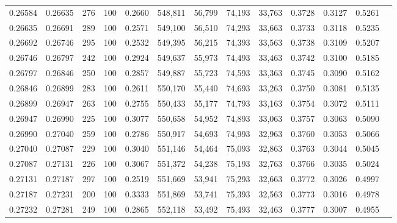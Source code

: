 \begin{tabular}{rrrrrrrrrrrrr}
0.26584 & 0.26635 &   276 & 100 &                                     0.2660 & 548,811 &  56,799 &  74,193 &  33,763 & 0.3728 & 0.3127 & 0.5261 \\
0.26635 & 0.26691 &   289 & 100 &                                     0.2571 & 549,100 &  56,510 &  74,293 &  33,663 & 0.3733 & 0.3118 & 0.5235 \\
0.26692 & 0.26746 &   295 & 100 &                                     0.2532 & 549,395 &  56,215 &  74,393 &  33,563 & 0.3738 & 0.3109 & 0.5207 \\
0.26746 & 0.26797 &   242 & 100 &                                     0.2924 & 549,637 &  55,973 &  74,493 &  33,463 & 0.3742 & 0.3100 & 0.5185 \\
0.26797 & 0.26846 &   250 & 100 &                                     0.2857 & 549,887 &  55,723 &  74,593 &  33,363 & 0.3745 & 0.3090 & 0.5162 \\
0.26846 & 0.26899 &   283 & 100 &                                     0.2611 & 550,170 &  55,440 &  74,693 &  33,263 & 0.3750 & 0.3081 & 0.5135 \\
0.26899 & 0.26947 &   263 & 100 &                                     0.2755 & 550,433 &  55,177 &  74,793 &  33,163 & 0.3754 & 0.3072 & 0.5111 \\
0.26947 & 0.26990 &   225 & 100 &                                     0.3077 & 550,658 &  54,952 &  74,893 &  33,063 & 0.3757 & 0.3063 & 0.5090 \\
0.26990 & 0.27040 &   259 & 100 &                                     0.2786 & 550,917 &  54,693 &  74,993 &  32,963 & 0.3760 & 0.3053 & 0.5066 \\
0.27040 & 0.27087 &   229 & 100 &                                     0.3040 & 551,146 &  54,464 &  75,093 &  32,863 & 0.3763 & 0.3044 & 0.5045 \\
0.27087 & 0.27131 &   226 & 100 &                                     0.3067 & 551,372 &  54,238 &  75,193 &  32,763 & 0.3766 & 0.3035 & 0.5024 \\
0.27131 & 0.27187 &   297 & 100 &                                     0.2519 & 551,669 &  53,941 &  75,293 &  32,663 & 0.3772 & 0.3026 & 0.4997 \\
0.27187 & 0.27231 &   200 & 100 &                                     0.3333 & 551,869 &  53,741 &  75,393 &  32,563 & 0.3773 & 0.3016 & 0.4978 \\
0.27232 & 0.27281 &   249 & 100 &                                     0.2865 & 552,118 &  53,492 &  75,493 &  32,463 & 0.3777 & 0.3007 & 0.4955 \\

\end{tabular}

